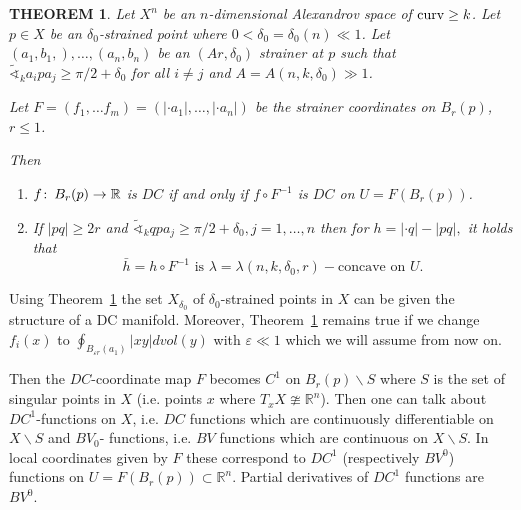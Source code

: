 \documentclass[12pt,leqno,intlimits]{amsart}
\numberwithin{equation}{section}
\newtheorem{thm}{THEOREM}[section]
\theoremstyle{definition}
\theoremstyle{remark}
\newcommand{\R}{\mathbb{R}}
\def\co{\colon\thinspace}
\def\eps{\varepsilon}
\newcommand{\curv}{\mathop{\rm curv}}
\begin{document}
\begin{thm}\label{thm-DC-Per}
Let $X^n$ be an $n$-dimensional Alexandrov space of $\curv\ge k$. Let $p\in X$ be an $\delta_0$-strained point where $0<\delta_0=\delta_0(n)\ll 1$. Let $ (a_1,b_1,),\ldots, (a_n,b_n)$ be an $(Ar,\delta_0)$ strainer at $p$ such that $\tilde\sphericalangle_ka_ipa_j\ge \pi/2+\delta_0$ for all $i\ne j$ and $A=A(n,k,\delta_0)\gg 1$.

Let  $F=(f_1,\ldots f_m)=(|\cdot a_1|,\ldots, |\cdot a_n|)$ be the strainer coordinates on $B_r(p)$, $r\le 1$.

Then

\begin{enumerate}
\item $f\co B_r(p)\to \R$ is $DC$ if and only if $f\circ F^{-1}$ is $DC$ on $U=F(B_r(p))$.
\item\label{semiconcave} If  $ |pq|\ge 2r$ and  $\tilde\sphericalangle_k qpa_j\ge \pi/2+\delta_0,  j=1,\ldots, n$ then for  $h=|\cdot q|-|pq|,$   it holds that
\[
\bar h=h\circ F^{-1} \text{ is } \lambda=\lambda(n, k,\delta_0,r)-\text{concave on } U.
\]
 \end{enumerate}
\end{thm}

Using Theorem~\ref{thm-DC-Per} the set $X_{\delta_0}$ of $\delta_0$-strained points in $X$ can be given the structure of a DC manifold. Moreover, Theorem~\ref{thm-DC-Per} remains true if we change  $f_i(x)$ to $\oint_{B_{\eps r}(a_1)}|xy|dvol(y)$ with $\eps\ll 1$ which we will assume from now on.

Then the $DC$-coordinate map $F$ becomes $C^1$ on $B_r(p)\backslash S$ where $S$ is the set of singular points in $X$ (i.e. points $x$ where $T_xX\ncong \R^n$).
Then one can talk about $DC^1$-functions on $X$, i.e. $DC$ functions which are continuously differentiable on $X\backslash S$ and $BV_0$- functions, i.e. $BV$ functions which are continuous on $X\backslash S$.
In local coordinates given by $F$ these correspond to $DC^1$ (respectively $BV^0$) functions on $U=F(B_r(p))\subset \R^n$.
Partial derivatives of $DC^1$ functions are $BV^0$.
\end{document}
